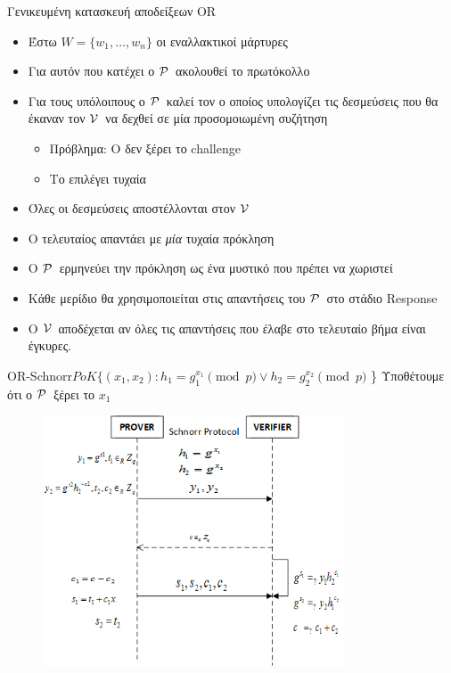 \documentclass[10pt,handout]{beamer}
\begin{document}
\begin{frame}{Γενικευμένη κατασκευή αποδείξεων OR}
\begin{itemize}
	\item Έστω $W = \{w_1, ..., w_n\}$ οι εναλλακτικοί μάρτυρες
	\pause
	\item Για αυτόν που κατέχει ο $\mathcal{P}\,$ ακολουθεί το πρωτόκολλο
	\pause
	\item Για τους υπόλοιπους ο $\mathcal{P}\,$ καλεί τον \siml ο οποίος υπολογίζει τις δεσμεύσεις που θα έκαναν τον $\mathcal{V}\,$ να δεχθεί σε μία προσομοιωμένη συζήτηση
	\pause
	\begin{itemize}
		\item \alert{Πρόβλημα:} O \siml δεν ξέρει το challenge
		\item {} Το επιλέγει τυχαία
	\end{itemize} 
	\item Όλες οι δεσμεύσεις αποστέλλονται στον $\mathcal{V}\,$ 
	\pause
	\item Ο τελευταίος απαντάει με \emph{μία} τυχαία πρόκληση
	\pause
	\item O $\mathcal{P}\,$ ερμηνεύει την πρόκληση ως ένα μυστικό που πρέπει να χωριστεί
	\pause
	\item Κάθε μερίδιο θα χρησιμοποιείται στις απαντήσεις του $\mathcal{P}\,$ στο στάδιο Response
	\pause
	\item Ο $\mathcal{V}\,$ αποδέχεται αν όλες τις απαντήσεις που έλαβε στο τελευταίο βήμα είναι έγκυρες.
\end{itemize}
\end{frame}

\begin{frame}{OR-Schnorr}{$PoK \{(x_1,x_2): h_1 = g_1^{x_1} \pmod{p} \vee h_2 = g_2^{x_2} \pmod{p}$ \} }
Υποθέτουμε ότι ο $\mathcal{P}\,$ ξέρει το $x_1$
\begin{figure}
	\centering
	\includegraphics[width=0.8\textwidth]{schnorrwid.png}
\end{figure}
\end{frame}
\end{document}
